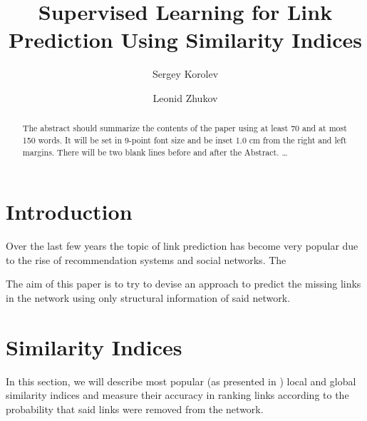\documentclass{llncs}
\begin{document}
%
\title{Supervised Learning for Link Prediction Using Similarity Indices}
%
%
\author{Sergey Korolev \and Leonid Zhukov}
%
%
%

\maketitle              %

\begin{abstract}
The abstract should summarize the contents of the paper
using at least 70 and at most 150 words. It will be set in 9-point
font size and be inset 1.0 cm from the right and left margins.
There will be two blank lines before and after the Abstract. \dots
{}
\end{abstract}
%
\section{Introduction}
%
Over the last few years the topic of link prediction has become very popular due to the rise of recommendation systems and social networks. The 

The aim of this paper is to try to devise an approach to predict the missing links in the network using only structural information of said network.
%
\section{Similarity Indices}
%
In this section, we will describe most popular (as presented in \cite{survey}) local and global similarity indices and measure their accuracy in ranking links according to the probability that said links were removed from the network.
\end{document}
